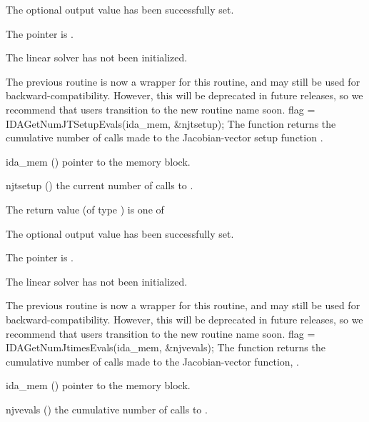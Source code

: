 {{\begin{args}
  \item[\Id{IDALS\_SUCCESS}]
    The optional output value has been successfully set.
  \item[\Id{IDALS\_MEM\_NULL}]
    The  pointer is .
  \item[\Id{IDALS\_LMEM\_NULL}]
    The {\idals} linear solver has not been initialized.
  \end{args}
}
{
  The previous routine  is now a wrapper for
  this routine, and may still be used for backward-compatibility.
  However, this will be deprecated in future releases, so we recommend
  that users transition to the new routine name soon.
}
{
  flag = IDAGetNumJTSetupEvals(ida\_mem, \&njtsetup);
}
{
  The function  returns the
  cumulative number of calls made to the Jacobian-vector setup
  function .
}
{
  \begin{args}
  \item[ida\_mem] ()
    pointer to the {\idas} memory block.
  \item[njtsetup] ()
    the current number of calls to .
  \end{args}
}
{
  The return value  (of type ) is one of
  \begin{args}
  \item[\Id{IDA\_SUCCESS}]
    The optional output value has been successfully set.
  \item[\Id{IDA\_MEM\_NULL}]
    The  pointer is .
  \item[\Id{IDA\_LMEM\_NULL}]
    The {\ida} linear solver has not been initialized.
  \end{args}
}
{
  The previous routine  is now a wrapper for
  this routine, and may still be used for backward-compatibility.
  However, this will be deprecated in future releases, so we recommend
  that users transition to the new routine name soon.
}
{
  flag = IDAGetNumJtimesEvals(ida\_mem, \&njvevals);
}
{
  The function  returns the
  cumulative number of calls made to the Jacobian-vector function,
  .
}
{
  \begin{args}[njvevals]
  \item[ida\_mem] ()
    pointer to the {\idas} memory block.
  \item[njvevals] ()
    the cumulative number of calls to .

\end{args}}}
